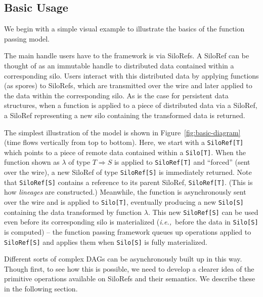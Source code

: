 \documentclass[10pt]{sigplanconf}
\theoremstyle{definition}
\theoremstyle{definition}
\newcommand{\ie}{{\em i.e.,~}}
\begin{document}
\subsection{Basic Usage}

We begin with a simple visual example to illustrate the basics of
the function passing model.

The main handle users have to the framework is via SiloRefs. A SiloRef can be
thought of as an immutable handle to distributed data contained within a
corresponding silo. Users interact with this distributed data by applying
functions (as spores) to SiloRefs, which are transmitted over the wire and later
applied to the data within the corresponding silo. As is the case for persistent
data structures, when a function is applied to a piece of distributed data via a
SiloRef, a SiloRef representing a new silo containing the transformed data is
returned.

The simplest illustration of the model is shown in
Figure~\ref{fig:basic-diagram} (time flows vertically from top to bottom).
Here, we start with a \verb|SiloRef[T]| which points to a piece of remote data
contained within a \verb|Silo[T]|. When the function shown as $\lambda$ of type
$T \Rightarrow S$ is applied to \verb|SiloRef[T]| and ``forced'' (sent over the
wire), a new SiloRef of type \verb|SiloRef[S]| is immediately returned. Note
that \verb|SiloRef[S]| contains a reference to its parent SiloRef,
\verb|SiloRef[T]|. (This is how {\em lineages} are constructed.) Meanwhile, the
function is asynchronously sent over the wire and is applied to \verb|Silo[T]|,
eventually producing a new \verb|Silo[S]| containing the data transformed by
function $\lambda$. This new \verb|SiloRef[S]| can be used even before its
corresponding silo is materialized (\ie before the data in \verb|Silo[S]| is
computed) – the function passing framework queues up operations applied to \verb|SiloRef[S]|
and applies them when \verb|Silo[S]| is fully materialized.

Different sorts of complex DAGs can be asynchronously built up in this way.
Though first, to see how this is possible, we need to develop a clearer idea of
the primitive operations available on SiloRefs and their semantics. We describe
these in the following section.
\end{document}
